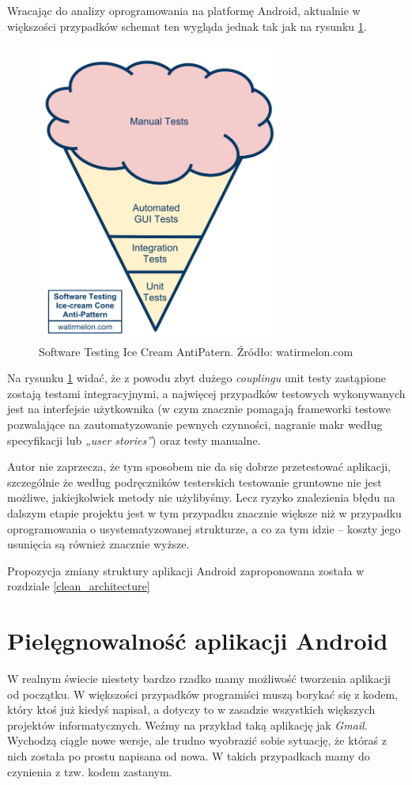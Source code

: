 Wracając do analizy oprogramowania na platformę Android, aktualnie w większości przypadków schemat ten wygląda jednak tak jak na rysunku \ref{fig:odwrocona_piramida}.

\begin{figure}[!htb]
    \centering
    \includegraphics[width=8cm]{imgs/ch3_odwrocona_piramida.png}
    \caption
{Software Testing Ice Cream AntiPatern. Źródło: watirmelon.com}
    \label{fig:odwrocona_piramida}
\end{figure} 

Na rysunku \ref{fig:odwrocona_piramida} widać, że z powodu zbyt dużego \textit{couplingu} unit testy zastąpione zostają testami integracyjnymi, a najwięcej przypadków testowych wykonywanych jest na interfejsie użytkownika (w czym znacznie pomagają frameworki testowe pozwalające na zautomatyzowanie pewnych czynności, nagranie makr według specyfikacji lub \textit{„user stories”}) oraz testy manualne.

Autor nie zaprzecza, że tym sposobem nie da się dobrze przetestować aplikacji, szczególnie że według podręczników testerskich testowanie gruntowne nie jest możliwe, jakiejkolwiek metody nie użylibyśmy. Lecz ryzyko znalezienia błędu na dalszym etapie projektu jest w tym przypadku znacznie większe niż w przypadku oprogramowania o usystematyzowanej strukturze, a co za tym idzie – koszty jego usunięcia są również znacznie wyższe.

Propozycja zmiany struktury aplikacji Android zaproponowana została w rozdziale \ref{clean_architecture}

\section{Pielęgnowalność aplikacji Android}
\label{pielegnowalnosc_aplikacji}
W realnym świecie niestety bardzo rzadko mamy możliwość tworzenia aplikacji od początku. W większości przypadków programiści muszą borykać się z kodem, który ktoś już kiedyś napisał, a dotyczy to w zasadzie wszystkich większych projektów informatycznych. Weźmy na przykład taką aplikację jak \textit{Gmail}. Wychodzą ciągle nowe wersje, ale trudno wyobrazić sobie sytuację, że któraś z nich została po prostu napisana od nowa. W takich przypadkach mamy do czynienia z tzw. kodem zastanym.

